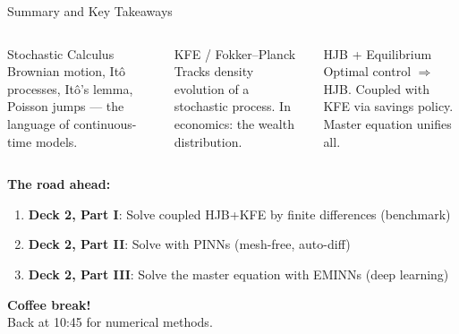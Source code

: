 \documentclass[aspectratio=169,11pt]{beamer}
\newcommand{\emphc}[1]{\textcolor{harvardcrimson}{#1}}
\begin{document}
\begin{frame}{Summary and Key Takeaways}
\begin{columns}[T]
\begin{block}{Stochastic Calculus}
\centering\small
\vspace{0.2em}
Brownian motion, It\^o processes, It\^o's lemma, Poisson jumps --- the \emphc{language} of continuous-time models.
\vspace{0.2em}
\end{block}

\begin{block}{KFE / Fokker--Planck}
\centering\small
\vspace{0.2em}
Tracks \emphc{density evolution} of a stochastic process. In economics: the wealth distribution.
\vspace{0.2em}
\end{block}

\begin{block}{HJB + Equilibrium}
\centering\small
\vspace{0.2em}
Optimal control $\Rightarrow$ HJB. Coupled with KFE via savings policy. Master equation unifies all.
\vspace{0.2em}
\end{block}
\end{columns}

\vspace{0.3em}
\textbf{The road ahead:}
\begin{enumerate}\itemsep1pt
    \item \textbf{Deck 2, Part I}: Solve coupled HJB+KFE by \emphc{finite differences} (benchmark)
    \item \textbf{Deck 2, Part II}: Solve with \emphc{PINNs} (mesh-free, auto-diff)
    \item \textbf{Deck 2, Part III}: Solve the \emphc{master equation} with EMINNs (deep learning)
\end{enumerate}

\vspace{0.2em}
\begin{center}
\colorbox{uzhgreylight}{\parbox{0.5\textwidth}{\centering\small
\textbf{Coffee break!}\\
Back at 10:45 for numerical methods.}}
\end{center}
\end{frame}
\end{document}
